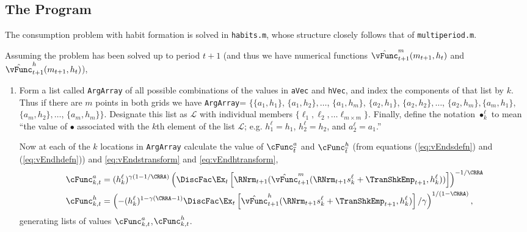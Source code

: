 \documentclass[\econtexRoot/SolvingMicroDSOPs]{subfiles}
\begin{document}
\hypertarget{The-Program}{}
\subsection{The Program}
The consumption problem with habit formation is solved in
\texttt{habits.m}, whose structure closely follows that of
\texttt{multiperiod.m}.

Assuming the problem has been solved up to period $t+1$ (and thus we
have numerical functions $\hat{\vFunc}_{t+1}^{m}({m}_{t+1},h_{t})$ and
$\hat{\vFunc}_{t+1}^{h}({m}_{t+1},h_{t})$),
\begin{enumerate}

\item Form a list called \texttt{ArgArray} of all possible
  combinations of the values in \texttt{aVec} and
  \texttt{hVec}, and index the components of that list by $k$.  Thus
  if there are $m$ points in both grids we have \texttt{ArgArray}=
  $\{\{{a}_{1},h_{1}\}$, $\{{a}_{1},h_{2}\},\ldots$,
  $\{{a}_{1},h_{m}\}$, $\{{a}_{2},h_{1}\}$,
  $\{{a}_{2},h_{2}\},\ldots$, $\{{a}_{2},h_{m}\},
  \{{a}_{m},h_{1}\}$, $\{{a}_{m},h_{2}\},\ldots$,
  $\{{a}_{m},h_{m}\}\}$.  Designate this list as $\mathcal{L}$
  with individual members $\{\ell_{1}, \ell_{2}, \ldots \ell_{m \times
    m}\}$.  Finally, define the notation $\bullet^{\ell}_{k}$ to mean
  ``the value of $\bullet$ associated with the $k$th element of the
  list $\mathcal{L}$; e.g. $h^{\ell}_{1} = h_{1}$, $h^{\ell}_{2} =
  h_{2}$, and ${a}^{\ell}_{2}={a}_{1}$.''

  Now at each of the $k$ locations in \texttt{ArgArray} calculate the
  value of $\cFunc_{\overline{t}}^{{a}}$ and $\cFunc_{\overline{t}}^{h}$ (from
  equations (\ref{eq:vEndsdefn}) and (\ref{eq:vEndhdefn})) and
  \eqref{eq:vEndstransform} and \eqref{eq:vEndhtransform},
  \begin{equation}\begin{gathered}\begin{aligned}
    \cFunc_{k,t}^{{a}}  & = (h_{k}^{\ell})^{\gamma(1-1/\CRRA)}
                             \left(\DiscFac \Ex_{t}
                             \left[
                             \RNrm_{t+1} (\hat{\vFunc}_{t+1}^{m}(\RNrm_{t+1} s^{\ell}_{k} +
                             {\TranShkEmp}_{t+1},h^{\ell}_{k}))
                             \right]
                             \right)^{-1/\CRRA}
    \\      \cFunc_{k,t}^{h}
                           & =                                         \left(-(h_{k}^{\ell})^{1-\gamma(\CRRA-1)} \DiscFac \Ex_{t}
                             \left[
                             \hat{\vFunc}_{t+1}^{h}(\RNrm_{t+1} s^{\ell}_{k} +
                             {\TranShkEmp}_{t+1},h^{\ell}_{k})
                             \right]/\gamma
                             \right)^{1/(1-\CRRA)},
  \end{aligned}\end{gathered}\end{equation}
generating lists of values
$\cFunc^{a}_{k,t}$,$\cFunc^{h}_{k,t}$.


\end{enumerate}
\end{document}

